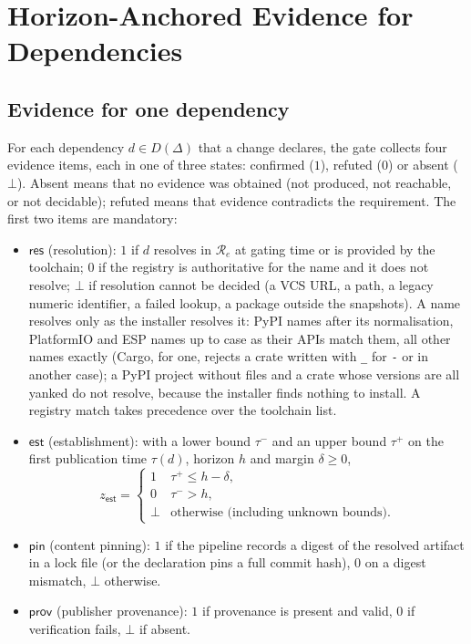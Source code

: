 \documentclass[conference]{IEEEtran}
\newcommand{\sres}{\mathsf{res}}
\newcommand{\sest}{\mathsf{est}}
\newcommand{\spin}{\mathsf{pin}}
\newcommand{\sprov}{\mathsf{prov}}
\newcommand{\Reg}{\mathcal{R}}
\begin{document}
\section{Horizon-Anchored Evidence for Dependencies}
\label{sec:approach}

\subsection{Evidence for one dependency}
For each dependency $d\in D(\Delta)$ that a change declares, the gate collects four evidence items, each in one of
three states: confirmed ($1$), refuted ($0$) or absent ($\bot$). Absent means that no evidence was obtained (not
produced, not reachable, or not decidable); refuted means that evidence contradicts the requirement. The first two
items are mandatory:
\begin{itemize}
\item $\sres$ (resolution): $1$ if $d$ resolves in $\Reg_e$ at gating time or is provided by the toolchain; $0$ if the
registry is authoritative for the name and it does not resolve; $\bot$ if resolution cannot be decided (a VCS URL, a
path, a legacy numeric identifier, a failed lookup, a package outside the snapshots). A name resolves only as the
installer resolves it: PyPI names after its normalisation, PlatformIO and ESP names up to case as their APIs match
them, all other names exactly (Cargo, for one, rejects a crate written with \texttt{\_} for \texttt{-} or in another
case); a PyPI project without files and a crate whose versions are all yanked do not resolve, because the installer
finds nothing to install. A registry match takes
precedence over the toolchain list.
\item $\sest$ (establishment): with a lower bound $\tau^{-}$ and an upper bound $\tau^{+}$ on the first publication
time $\tau(d)$, horizon $h$ and margin $\delta\ge 0$,
\begin{equation}
z_{\sest}=\begin{cases} 1 & \tau^{+}\le h-\delta,\\ 0 & \tau^{-}>h,\\ \bot & \text{otherwise (including unknown bounds).}\end{cases}
\label{eq:est}
\end{equation}
\item $\spin$ (content pinning): $1$ if the pipeline records a digest of the resolved artifact in a lock file (or the
declaration pins a full commit hash), $0$ on a digest mismatch, $\bot$ otherwise.
\item $\sprov$ (publisher provenance): $1$ if provenance is present and valid, $0$ if verification fails,
$\bot$ if absent.
\end{itemize}
\end{document}
